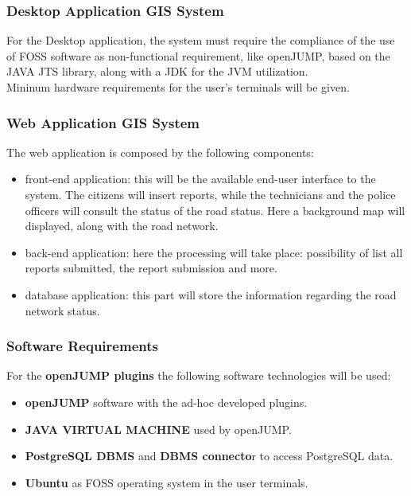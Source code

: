 \subsubsection{Desktop Application GIS System}
For the Desktop application, the system must require the compliance of the use of FOSS software as non-functional requirement, like openJUMP, based on the JAVA JTS library, along with a JDK for the JVM utilization. \\
Mininum hardware requirements for the user's terminals will be given.

\subsubsection{Web Application GIS System}
The web application is composed by the following components:
\begin{itemize}
    \item front-end application: this will be the available end-user interface to the system. The citizens will insert reports, while the technicians and the police officers will consult the status of the road status.
    Here a background map will displayed, along with the road network.
    \item back-end application: here the processing will take place: possibility of list all reports submitted, the report submission and more.
    \item database application: this part will store the information regarding the road network status.
\end{itemize}

\subsubsection{Software Requirements}
For the \textbf{openJUMP plugins} the following software technologies will be used:
\begin{itemize}
    \item \textbf{openJUMP} software with the ad-hoc developed plugins.
    \item \textbf{JAVA VIRTUAL MACHINE} used by openJUMP. 
    \item \textbf{PostgreSQL DBMS} and \textbf{DBMS connecto}r to access PostgreSQL data.
    \item \textbf{Ubuntu} as FOSS operating system in the user terminals. 
\end{itemize}

\newpage

